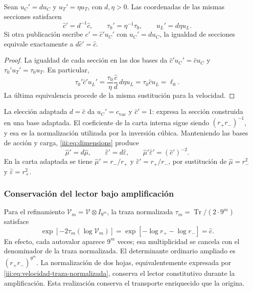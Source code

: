 \begin{proposition}
Sean $u_C'=d u_C$ y $u_T'=\eta u_T$, con $d,\eta>0$.
Las coordenadas de las mismas secciones satisfacen
\begin{equation}
 \widehat c'=d^{-1}\widehat c,
 \qquad \tau_0'=\eta^{-1}\tau_0,
 \qquad u_L'=d\eta u_L.
 \label{iii:eq:velocidad-cambio-carta}
\end{equation}
Si otra publicación escribe $c'=\widehat c' u_C'$ con $u_C'=d u_C$,
la igualdad de secciones equivale exactamente a $d\widehat c'=\widehat c$.
\end{proposition}
\begin{proof}
La igualdad de cada sección en las dos bases da
$\widehat c'u_C'=\widehat c u_C$ y $\tau_0'u_T'=\tau_0u_T$.
En particular,
\[
 \tau_0'\widehat c'u_L'
 =\frac{\tau_0}{\eta}\frac{\widehat c}{d}\,d\eta u_L
 =\tau_0\widehat c u_L=\ell_0.
\]
La última equivalencia procede de la misma sustitución para la velocidad.
\end{proof}

La elección adaptada $d=\widehat c$ da $u_C'=c_{\mathrm{vac}}$ y
$\widehat c'=1$: expresa la sección construida en una base adaptada.
El coeficiente de la carta interna sigue siendo $(r_+r_-)^{-1}$, y esa
es la normalización utilizada por la inversión cúbica. Manteniendo las
bases de acción y carga, \eqref{iii:eq:dimensions} produce
\[
 \widehat\mu'=d\widehat\mu,\qquad
 \widehat\varepsilon'=d\widehat\varepsilon,\qquad
 \widehat\mu'\widehat\varepsilon'=(\widehat c')^{-2}.
\]
En la carta adaptada se tiene $\widehat\mu'=r_-/r_+$ y
$\widehat\varepsilon'=r_+/r_-$, por sustitución de
$\widehat\mu=r_-^2$ y $\widehat\varepsilon=r_+^2$.

\subsubsection{Conservación del lector bajo amplificación}

Para el refinamiento $\mathcal V_m=\mathcal V\otimes I_{9^m}$, la
traza normalizada $\tau_m=\operatorname{Tr}/(2\cdot9^m)$ satisface
\begin{equation}
 \exp[-2\tau_m(\log\mathcal V_m)]
 =\exp[-\log r_+-\log r_-]=\widehat c.
 \label{iii:eq:velocidad-traza-normalizada}
\end{equation}
En efecto, cada autovalor aparece $9^m$ veces; esa multiplicidad se
cancela con el denominador de la traza normalizada. El determinante
ordinario ampliado es $(r_+r_-)^{9^m}$. La normalización de dos hojas,
equivalentemente expresada por \eqref{iii:eq:velocidad-traza-normalizada},
conserva el lector constitutivo durante la amplificación. Esta
realización conserva el transporte enriquecido que la origina.

